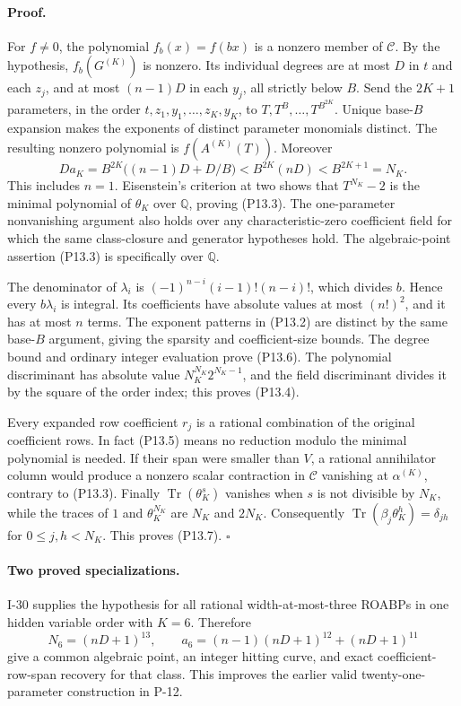 \paragraph{Proof.}
For $f\ne0$, the polynomial $f_b(x)=f(bx)$ is a nonzero member
of $\mathcal C$. By the hypothesis, $f_b(G^{(K)})$ is nonzero.
Its individual degrees are at most $D$ in $t$ and each $z_j$,
and at most $(n-1)D$ in each $y_j$, all strictly below $B$.
Send the $2K+1$ parameters, in the order
$t,z_1,y_1,\ldots,z_K,y_K$, to
$T,T^B,\ldots,T^{B^{2K}}$. Unique base-$B$ expansion makes
the exponents of distinct parameter monomials distinct.
The resulting nonzero polynomial is $f(A^{(K)}(T))$.
Moreover
\[
 Da_K=B^{2K}\bigl((n-1)D+D/B\bigr)
       <B^{2K}(nD)<B^{2K+1}=N_K.
\]
This includes $n=1$. Eisenstein's criterion at two shows that
$T^{N_K}-2$ is the minimal polynomial of $\theta_K$ over
$\mathbb Q$, proving (P13.3). The one-parameter nonvanishing
argument also holds over any characteristic-zero coefficient
field for which the same class-closure and generator hypotheses
hold. The algebraic-point assertion (P13.3) is specifically over
$\mathbb Q$.

The denominator of $\lambda_i$ is
$(-1)^{n-i}(i-1)!(n-i)!$, which divides $b$. Hence every
$b\lambda_i$ is integral. Its coefficients have absolute values
at most $(n!)^2$, and it has at most $n$ terms. The exponent
patterns in (P13.2) are distinct by the same base-$B$ argument,
giving the sparsity and coefficient-size bounds. The degree
bound and ordinary integer evaluation prove (P13.6). The
polynomial discriminant has absolute value
$N_K^{N_K}2^{N_K-1}$, and the field discriminant divides it by
the square of the order index; this proves (P13.4).

Every expanded row coefficient $r_j$ is a rational combination
of the original coefficient rows. In fact (P13.5) means no
reduction modulo the minimal polynomial is needed. If their
span were smaller than $V$, a rational annihilator column
would produce a nonzero scalar contraction in $\mathcal C$
vanishing at $\alpha^{(K)}$, contrary to (P13.3).
Finally $\operatorname{Tr}(\theta_K^s)$ vanishes when $s$ is not
divisible by $N_K$, while the traces of $1$ and $\theta_K^{N_K}$
are $N_K$ and $2N_K$. Consequently
$\operatorname{Tr}(\beta_j\theta_K^h)=\delta_{jh}$ for
$0\leq j,h<N_K$. This proves (P13.7). $\square$

\paragraph{Two proved specializations.}
I-30 supplies the hypothesis for all rational width-at-most-three
ROABPs in one hidden variable order with $K=6$. Therefore
\[
 N_6=(nD+1)^{13},\qquad
 a_6=(n-1)(nD+1)^{12}+(nD+1)^{11}
\]
give a common algebraic point, an integer hitting curve, and exact
coefficient-row-span recovery for that class. This improves the
earlier valid twenty-one-parameter construction in P-12.

